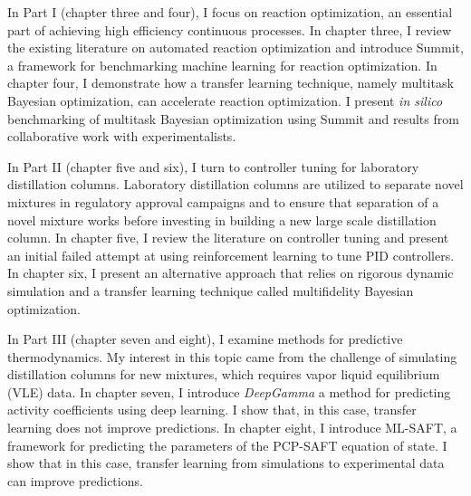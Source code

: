 In Part I (chapter three and four), I focus on reaction optimization, an essential part of achieving high efficiency continuous processes. In chapter three, I review the existing literature on automated reaction optimization and introduce Summit, a framework for benchmarking machine learning for reaction optimization.  In chapter four, I demonstrate how a transfer learning technique, namely multitask Bayesian optimization, can accelerate reaction optimization. I present \textit{in silico} benchmarking of multitask Bayesian optimization using Summit and results from collaborative work with experimentalists.

In Part II (chapter five and six), I turn to controller tuning for laboratory distillation columns. Laboratory distillation columns are utilized to separate novel mixtures in regulatory approval campaigns and to ensure that separation of a novel mixture works before investing in building a new large scale distillation column. In chapter five, I review the literature on controller tuning and present an initial failed attempt at using reinforcement learning to tune PID controllers. In chapter six, I present an alternative approach that relies on rigorous dynamic simulation and a transfer learning technique called multifidelity Bayesian optimization.

In Part III (chapter seven and eight), I examine methods for predictive thermodynamics. My interest in this topic came from the challenge of simulating distillation columns for new mixtures, which requires vapor liquid equilibrium (VLE) data. In chapter seven, I introduce \textit{DeepGamma} a method for predicting activity coefficients using deep learning. I show that, in this case, transfer learning does not improve predictions. In chapter eight, I introduce ML-SAFT, a framework for predicting the parameters of the PCP-SAFT equation of state. I show that in this case, transfer learning from simulations to experimental data can improve predictions.





